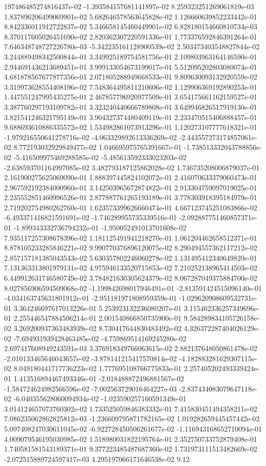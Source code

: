197486485274816437e-02	-1.393584157681141897e-02	8.259323251269061819e-03	1.837896206499069901e-02	5.682646578563645828e-02	1.126660639852233442e-01	8.842336011912722837e-02	5.346658145460449901e-02	6.828180154660810734e-03	8.370117605026451690e-02	2.820362307220591336e-01	1.773376592846391264e-01	7.646348748727226780e-03	-5.342235161128900539e-02	2.503473403548827844e-02	3.244889498342500844e-01	3.349925189754581756e-01	2.109803963164146590e-01	2.944691436213689451e-01	3.999133054673199017e-01	5.512095202803080074e-01	4.681878567677877356e-01	2.071805288949668533e-01	9.809630093132920559e-02	3.319973628554408196e-02	7.548364495811210606e-02	1.129906369192890253e-01	1.447551247995435275e-01	2.467857796920977509e-01	3.654175661162159527e-01	3.387760297193109782e-01	3.323240440666789808e-01	3.649946826517919130e-01	3.821541246321795149e-01	3.904327374480409119e-01	2.233470515406888457e-01	9.688693610886335572e-02	1.534982861073913296e-01	1.120273107777618321e-01	-1.979216550641278716e-02	-4.063329892613336269e-02	-2.443557273174857061e-02	8.772193032929849477e-02	1.046695975765391667e-01	-1.738513332043788856e-02	-5.416509975469288585e-02	-5.485613592333023203e-02	-2.638593701164997085e-02	3.482793187125862028e-02	1.746735208006879037e-01	2.161900275625069090e-01	1.888397445824102072e-01	2.416070633379060473e-01	2.967592192384000960e-01	3.142503965672874822e-01	2.913304759097019025e-01	2.235552851460996526e-01	2.877887761265193189e-01	3.778303918395184979e-01	2.719202754980262760e-01	1.623573399626660474e-01	4.667123745251083866e-02	-6.493371416821591691e-02	-1.746289955735339516e-01	-2.092887751460857371e-01	-1.899343332736794232e-01	-1.950052491013701608e-02	7.935117257308678396e-02	1.181125491941218270e-01	1.061204462658512371e-01	8.878105233285846221e-02	9.990770376896120075e-02	8.290494557362117212e-02	2.857157181385043543e-02	5.630357802246060278e-02	1.131495412340649820e-01	7.131363313801979131e-02	4.975946133520715853e-02	7.210252138965414503e-02	6.449912631746580749e-02	3.784821630305624379e-02	8.067287049375884700e-02	8.027856906594509068e-02	-1.199842698017946491e-01	-2.813591424515096140e-01	-4.034163745631801912e-01	-2.951181971808959359e-01	-1.029620908609532731e-01	3.364246697617013226e-01	5.253923132236080207e-01	3.115462336257349696e-01	2.255446547884506214e-01	2.001540866850735900e-01	9.584289834105726158e-02	3.269200937363483939e-02	8.730417644830483492e-02	4.326372287404026129e-02	-7.694931939428463485e-02	-4.759869514169245280e-02	2.697417608949243591e-03	3.376918349766063615e-02	2.882137648050861478e-02	-2.010133465646043657e-02	-3.878141215417570814e-02	-4.182883281629307115e-02	8.049180441717736223e-02	1.777695108766775833e-01	2.257405202493339424e-01	1.413516894467493346e-01	-2.018488872496881567e-02	-1.584724624982566596e-02	-7.002563729016464227e-03	-2.837434083079647118e-02	-6.040355628060094934e-02	-1.023590257160591349e-01	3.014124657073760302e-02	1.733525059846383332e-01	7.415830451494358211e-02	7.086235062862825812e-03	-1.236609795871782165e-02	1.019282659445457442e-02	5.097408247030611045e-02	-6.922728450506261677e-02	-1.116943168652710094e-01	4.009079546195030985e-02	1.518980031822195764e-01	2.352750733752879408e-01	1.740581581543189371e-01	9.377223485487687360e-02	1.731973111513482669e-02	-2.072515889724597417e-03	4.295197066171646538e-02	9.12
